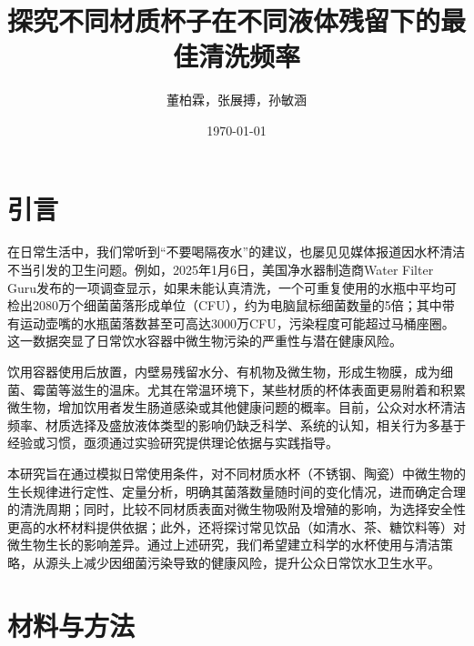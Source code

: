 \documentclass[12pt,a4paper]{ctexart}
\title{探究不同材质杯子在不同液体残留下的最佳清洗频率}
\author{董柏霖，张展搏，孙敏涵}
\date{\today}  %
\begin{document}
\maketitle  %

\begin{abstract}

\end{abstract}
\newpage
\tableofcontents
\newpage

\section{引言}
在日常生活中，我们常听到“不要喝隔夜水”的建议，也屡见见媒体报道因水杯清洁不当引发的卫生问题。例如，2025年1月6日，美国净水器制造商Water Filter Guru发布的一项调查显示，如果未能认真清洗，一个可重复使用的水瓶中平均可检出2080万个细菌菌落形成单位（CFU），约为电脑鼠标细菌数量的5倍；其中带有运动壶嘴的水瓶菌落数甚至可高达3000万CFU，污染程度可能超过马桶座圈。这一数据突显了日常饮水容器中微生物污染的严重性与潜在健康风险。

饮用容器使用后放置，内壁易残留水分、有机物及微生物，形成生物膜，成为细菌、霉菌等滋生的温床。尤其在常温环境下，某些材质的杯体表面更易附着和积累微生物，增加饮用者发生肠道感染或其他健康问题的概率。目前，公众对水杯清洁频率、材质选择及盛放液体类型的影响仍缺乏科学、系统的认知，相关行为多基于经验或习惯，亟须通过实验研究提供理论依据与实践指导。

本研究旨在通过模拟日常使用条件，对不同材质水杯（不锈钢、陶瓷）中微生物的生长规律进行定性、定量分析，明确其菌落数量随时间的变化情况，进而确定合理的清洗周期；同时，比较不同材质表面对微生物吸附及增殖的影响，为选择安全性更高的水杯材料提供依据；此外，还将探讨常见饮品（如清水、茶、糖饮料等）对微生物生长的影响差异。通过上述研究，我们希望建立科学的水杯使用与清洁策略，从源头上减少因细菌污染导致的健康风险，提升公众日常饮水卫生水平。


\section{材料与方法}
\end{document}
